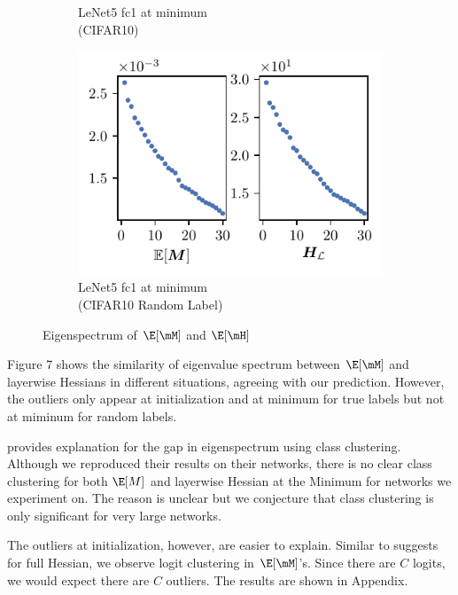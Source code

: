 \begin{figure}[th]
\begin{subfigure}[b]{0.33\textwidth}
        \caption{LeNet5 fc1 at minimum\\(CIFAR10)}
        \label{fig:UTAU_H_spec_Lenet}
    \end{subfigure}%
    \begin{subfigure}[b]{0.32\textwidth}
        \centering
        \captionsetup{justification=centering}
        \includegraphics[width=\textwidth]{Figures/EM_vs_H/LeNet5_RL/UTAU_vs_full_sigval_d30_CIFAR10_RandomLabel_LeNet5_fixlr0.01_RLR4_E-1_fc1.pdf}
        \caption{LeNet5 fc1 at minimum\\(CIFAR10 Random Label)}
        \label{fig:UTAU_H_spec_RL}
    \end{subfigure}
    \captionsetup{justification=centering}
    \caption{Eigenspectrum of $\E[\mM]$ and $\E[\mH]$}
    \label{fig:UTAU_H_spec}
\end{figure}

Figure 7 shows the similarity of eigenvalue spectrum between $\E[\mM]$ and layerwise Hessians in different situations, agreeing with our prediction. However, the outliers only appear at initialization and at minimum for true labels but not at miminum for random labels.

\citet{papyan2019measurements} provides explanation for the gap in eigenspectrum using class clustering. Although we reproduced their results on their networks, there is no clear class clustering for both $\E[M]$ and layerwise Hessian at the Minimum for networks we experiment on. The reason is unclear but we conjecture that class clustering is only significant for very large networks.

The outliers at initialization, however, are easier to explain. Similar to \citet{papyan2019measurements} suggests for full Hessian, we observe logit clustering in $\E[\mM]$'s. Since there are $C$ logits, we would expect there are $C$ outliers. The results are shown in Appendix.

